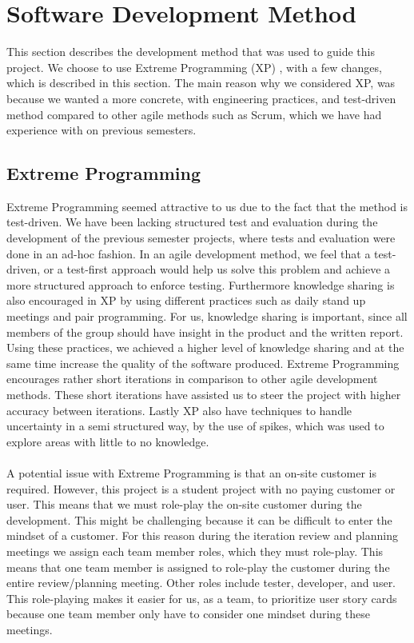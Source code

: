 
\section{Software Development Method}
\label{sec:software_development_method}

This section describes the development method that was used to guide this project. We choose to use Extreme Programming (XP) \parencite{xp}, with a few changes, which is described in this section. The main reason why we considered XP, was because we wanted a more concrete, with engineering practices, and test-driven method compared to other agile methods such as Scrum, which we have had experience with on previous semesters.

\subsection{Extreme Programming}
Extreme Programming seemed attractive to us due to the fact that the method is test-driven. We have been lacking structured test and evaluation during the development of the previous semester projects, where tests and evaluation were done in an ad-hoc fashion. In an agile development method, we feel that a test-driven, or a test-first approach would help us solve this problem and achieve a more structured approach to enforce testing. Furthermore knowledge sharing is also encouraged in XP by using different practices such as daily stand up meetings and pair programming. For us, knowledge sharing is important, since all members of the group should have insight in the product and the written report. Using these practices, we achieved a higher level of knowledge sharing and at the same time increase the quality of the software produced. Extreme Programming encourages rather short iterations in comparison to other agile development methods. These short iterations have assisted us to steer the project with higher accuracy between iterations. Lastly XP also have techniques to handle uncertainty in a semi structured way, by the use of spikes, which was used to explore areas with little to no knowledge. 
\\\\
A potential issue with Extreme Programming is that an on-site customer is required. However, this project is a student project with no paying customer or user. This means that we must role-play the on-site customer during the development. This might be challenging because it can be difficult to enter the mindset of a customer. For this reason during the iteration review and planning meetings we assign each team member roles, which they must role-play. This means that one team member is assigned to role-play the customer during the entire review/planning meeting. Other roles include tester, developer, and user. This role-playing makes it easier for us, as a team, to prioritize user story cards because one team member only have to consider one mindset during these meetings.

